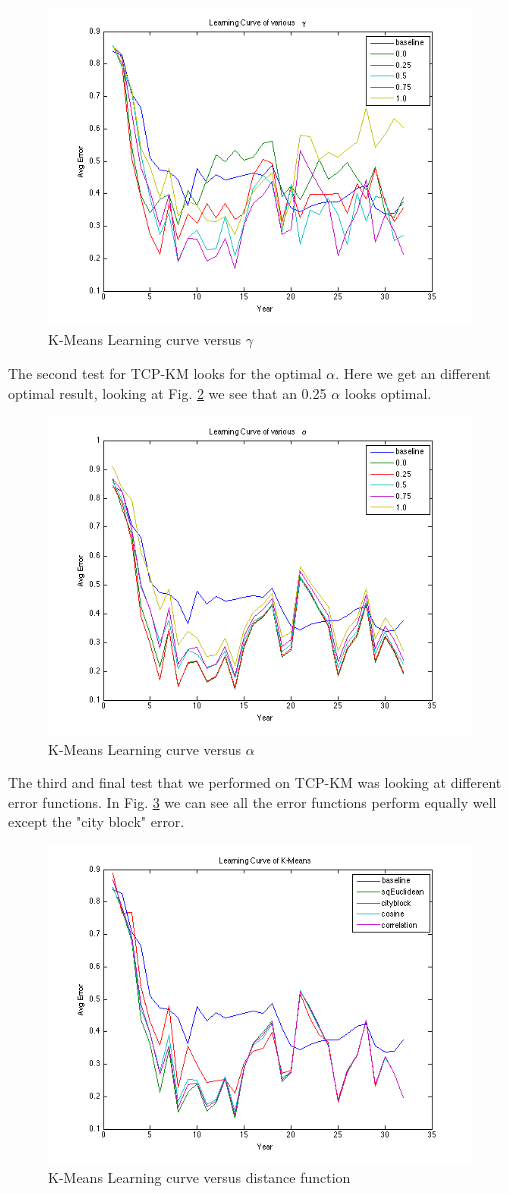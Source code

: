 \documentclass[conference]{IEEEtran}
\begin{document}
\begin{figure}[h]
	\center
	\includegraphics[width=.50\textwidth]{fig/kmeans_gamma.png}
	\caption{K-Means Learning curve versus $\gamma$}
	\label{kmeans_gamma}
\end{figure}

The second test for TCP-KM looks for the optimal $\alpha$. Here we get an different optimal result, looking at Fig. \ref{kmeans_alpha} we see that an 0.25 $\alpha$ looks optimal.

\begin{figure}[h]
	\center
	\includegraphics[width=.50\textwidth]{fig/kmeans_alpha.png}
	\caption{K-Means Learning curve versus $\alpha$}
	\label{kmeans_alpha}
\end{figure}

The third and final test that we performed on TCP-KM was looking at different error functions. In Fig. \ref{kmeans_dist} we can see all the error functions perform equally well except the "city block" error.

\begin{figure}[h]
	\center
	\includegraphics[width=.50\textwidth]{fig/kmeans_dist.png}
	\caption{K-Means Learning curve versus distance function}
	\label{kmeans_dist}
\end{figure}
\end{document}
